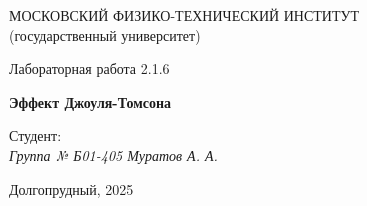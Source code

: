 \thispagestyle{empty}

\begin{center}
    МОСКОВСКИЙ ФИЗИКО-ТЕХНИЧЕСКИЙ ИНСТИТУТ \\
    (государственный университет)
\end{center}

\vfill

\begin{center}
    Лабораторная работа 2.1.6 \\ 
    \vspace{20pt}
    
    \textbf{Эффект Джоуля-Томсона}
\end{center}  

\vfill

    \noindent Студент: \\
    \textit{Группа № Б01-405 \hfill Муратов А. А.}

\vfill

\begin{center}
    Долгопрудный, 2025
\end{center}